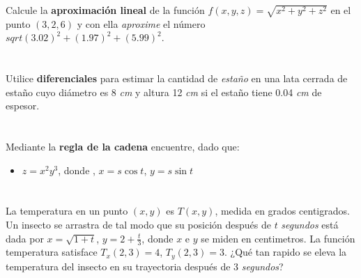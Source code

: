 \documentclass[12pt]{article}
\begin{document}
Calcule la \textbf{aproximación lineal} de la función $f(x,y,z)=\sqrt{x^2+y^2+z^2}$ en el punto $(3,2,6)$ y con ella \textit{aproxime} el número $sqrt{(3.02)^2+(1.97)^2+(5.99)^2}$.

\section{}

Utilice \textbf{diferenciales} para estimar la cantidad de \textit{estaño} en una lata cerrada de estaño cuyo diámetro es 8 \textit{cm} y altura 12 \textit{cm} si el estaño tiene
0.04 \textit{cm} de espesor.

\section{}

Mediante la \textbf{regla de la cadena} encuentre, dado que:

\begin{itemize}[format=\textbf]

\item $z=x^2y^3$, donde , $x=s\cos{t}$, $y=s\sin{t}$

\end{itemize}

\section{}

La temperatura en un punto $(x, y)$ es $T(x, y)$, medida en grados centigrados. Un insecto se arrastra de tal modo que su posición después de $t$ \textit{segundos} está dada por $x =
\sqrt{1 + t}$, $y = 2 + \frac{t}{3}$, donde $x$ e $y$ se miden en centimetros. La función temperatura satisface $T_x(2, 3) = 4$, $T_y(2, 3) = 3$.
¿Qué tan rapido se eleva la temperatura del insecto en su trayectoria después de 3 \textit{segundos}?

\section{}
\end{document}
